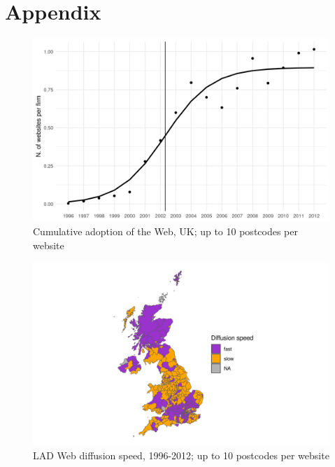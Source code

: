 \documentclass[
  authoryear,
  preprint,
  3p]{elsarticle}
\begin{document}
\setcounter{section}{0}
\renewcommand{\thesection}{\Alph{section}}
\setcounter{table}{0}
\renewcommand{\thetable}{A\arabic{table}}
\setcounter{figure}{0}
\renewcommand{\thefigure}{A\arabic{figure}}

\section{Appendix}\label{appendix}


\begin{figure}[H]

{\centering \includegraphics[width=1\textwidth,height=\textheight]{../../outputs/s/s_uk_per_firm_10.png}

}

\caption{\label{s_uk10}Cumulative adoption of the Web, UK; up to 10
postcodes per website}

\end{figure}%

\begin{figure}[H]

{\centering \includegraphics[width=1\textwidth,height=\textheight]{../../outputs/s/speed_map_10.png}

}

\caption{\label{s_map10}LAD Web diffusion speed, 1996-2012; up to 10
postcodes per website}

\end{figure}%
\end{document}
